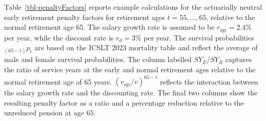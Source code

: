 \documentclass[
  letterpaper,
  DIV=11,
  numbers=noendperiod]{scrreprt}
\begin{document}
Table~\ref{tbl-penaltyFactors} reports example calculations for the
actuarially neutral early retirement penalty factors for retirement ages
\(t=55,\ldots,65\), relative to the normal retirement age 65. The salary
growth rate is assumed to be \(r_{\text{sgr}} = 2.4\%\) per year, while
the discount rate is \(r_{d} = 3\%\) per year. The survival
probabilities \({}_{(65-t)}p_{t}\) are based on the ICSLT 2023 mortality
table and reflect the average of male and female survival probabilities.
The column labelled \(SY_{E}/SY_{R}\) captures the ratio of service
years at the early and normal retirement ages relative to the normal
retirement age of 65 years. \((v_{\text{sgr}}/v)^{65-t}\) reflects the
interaction between the salary growth rate and the discounting rate. The
final two columns show the resulting penalty factor as a ratio and a
percentage reduction relative to the unreduced pension at age \(65\).
\end{document}
